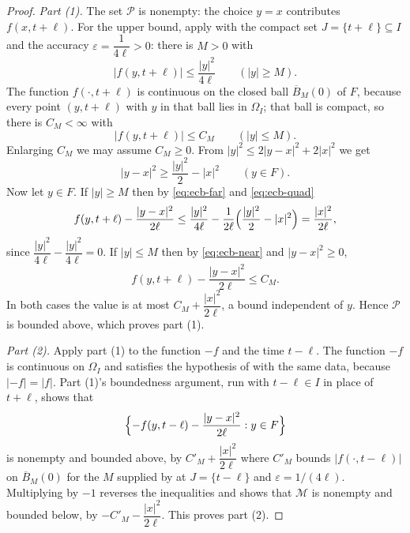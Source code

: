 \begin{proof}
\emph{Part (1).} The set $\mathcal P$ is nonempty: the choice $y=x$ contributes
$f(x,t+\ell)$. For the upper bound, apply  with the
compact set $J=\{t+\ell\}\subseteq I$ and the accuracy
$\varepsilon=\dfrac{1}{4\ell}>0$: there is $M>0$ with
\begin{equation}\label{eq:ecb-far}
  |f(y,t+\ell)|\le\frac{|y|^2}{4\ell}\qquad(|y|\ge M).
\end{equation}
The function $f(\cdot,t+\ell)$ is continuous on the closed ball
$\overline B_M(0)$ of $F$, because every point $(y,t+\ell)$ with $y$ in that
ball lies in $\Omega_I$; that ball is compact, so there is $C_M<\infty$ with
\begin{equation}\label{eq:ecb-near}
  |f(y,t+\ell)|\le C_M\qquad(|y|\le M).
\end{equation}
Enlarging $C_M$ we may assume $C_M\ge0$. From
$|y|^2\le2|y-x|^2+2|x|^2$ we get
\begin{equation}\label{eq:ecb-quad}
  |y-x|^2\ge\frac{|y|^2}{2}-|x|^2\qquad(y\in F).
\end{equation}
Now let $y\in F$. If $|y|\ge M$ then by \eqref{eq:ecb-far} and
\eqref{eq:ecb-quad}
\[
  f(y,t+\ell)-\frac{|y-x|^2}{2\ell}
   \le\frac{|y|^2}{4\ell}
       -\frac{1}{2\ell}\Bigl(\frac{|y|^2}{2}-|x|^2\Bigr)
   =\frac{|x|^2}{2\ell},
\]
since $\dfrac{|y|^2}{4\ell}-\dfrac{|y|^2}{4\ell}=0$. If $|y|\le M$ then by
\eqref{eq:ecb-near} and $|y-x|^2\ge0$,
\[
  f(y,t+\ell)-\frac{|y-x|^2}{2\ell}\le C_M .
\]
In both cases the value is at most $C_M+\dfrac{|x|^2}{2\ell}$, a bound
independent of $y$. Hence $\mathcal P$ is bounded above, which proves part (1).

\emph{Part (2).} Apply part (1) to the function $-f$ and the time $t-\ell$. The
function $-f$ is continuous on $\Omega_I$ and satisfies the hypothesis of
 with the same data, because $|-f|=|f|$. Part (1)'s
boundedness argument, run with $t-\ell\in I$ in place of $t+\ell$, shows that
\[
  \Bigl\{-f(y,t-\ell)-\frac{|y-x|^2}{2\ell}:y\in F\Bigr\}
\]
is nonempty and bounded above, by $C'_M+\dfrac{|x|^2}{2\ell}$ where $C'_M$
bounds $|f(\cdot,t-\ell)|$ on $\overline B_M(0)$ for the $M$ supplied by
 at $J=\{t-\ell\}$ and
$\varepsilon=1/(4\ell)$. Multiplying by $-1$ reverses the inequalities and shows
that $\mathcal M$ is nonempty and bounded below, by
$-C'_M-\dfrac{|x|^2}{2\ell}$. This proves part (2).


\end{proof}
